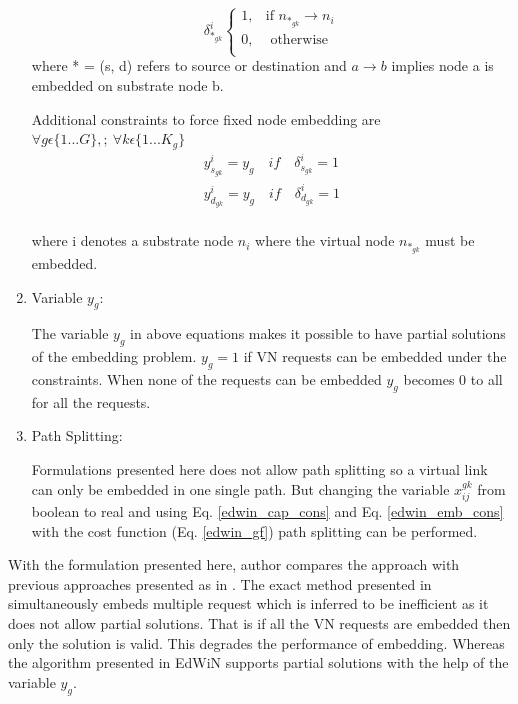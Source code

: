 \documentclass[article,dr=phil,type=msc ,colorback,accentcolor=tud4b]{tudthesis}
\begin{document}
\begin{enumerate}[label=(\Alph*)]
	\begin{equation}
	\delta^{i}_{*_{gk}} 
	\begin{cases}
	1, & \text{if }   n_{*_{gk}}\rightarrow n_{i} \\
	0, & \text{ otherwise} \\
	\end{cases}
	\end{equation} 
	where * = (s, d) refers to source or destination and $a \rightarrow b$ implies node a is embedded on substrate node b. \newline
	
	Additional constraints to force fixed node embedding are $ \forall g \epsilon \{1...G\}, ;\ \forall k \epsilon \{1...K_{g}\}$ 
	\begin{equation}
	\begin{split}
	y^{i}_{s_{gk}} =  y_{g} \quad if \quad \delta^{i}_{s_{gk}}  = 1\\
	y^{i}_{d_{gk}} =  y_{g} \quad if \quad \delta^{i}_{d_{gk}}  = 1\\
	\end{split}
	\end{equation} 
	
	where i denotes a substrate node $n_{i}$ where the virtual node $n_{*_{gk}}$ must be embedded. \newline
	
	\item Variable $y_{g}$: 
	
	The variable $y_{g}$ in above equations makes it
	possible to have partial solutions of the embedding problem. $y_{g} = 1$ if VN requests can be embedded under the constraints. When none of the
	requests can be embedded $y_{g}$ becomes 0 to all for all the requests.\newline
	
	\item  Path Splitting: 
	
	Formulations presented here does not allow path splitting so a virtual link can only be embedded in one single path. But changing the variable $x^{gk}_{ij}$ from boolean to real and using Eq. \ref{edwin_cap_cons} and Eq. \ref{edwin_emb_cons} with the cost function (Eq. \ref{edwin_gf}) path splitting can be performed. 
	
\end{enumerate}

With the formulation presented here, author compares the approach with previous approaches presented as in \cite{vn_multiple}. The exact method presented in \cite{vn_multiple} simultaneously embeds multiple request which is inferred to be inefficient as it does not allow partial solutions. That is if all the VN requests are embedded then only the solution is valid. This degrades the performance of embedding. Whereas the algorithm presented in EdWiN supports partial solutions  with the help of the variable $y_{g}$. \newline
\end{document}
